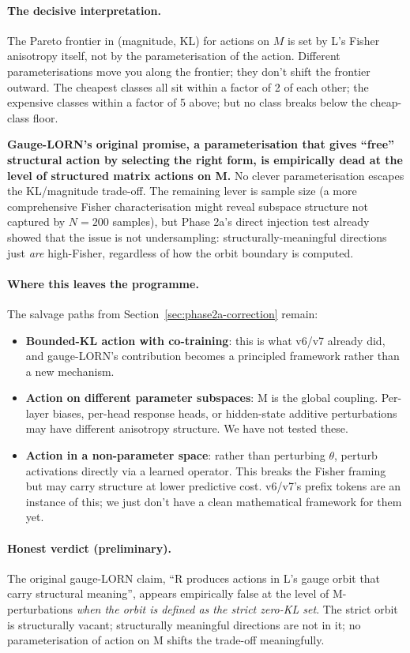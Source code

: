 \documentclass[11pt, a4paper]{article}
\theoremstyle{plain}
\theoremstyle{definition}
\theoremstyle{remark}
\begin{document}
\paragraph{The decisive interpretation.}
The Pareto frontier in (magnitude, KL) for actions on $M$ is set by L's Fisher anisotropy itself, not by the parameterisation of the action.
Different parameterisations move you along the frontier; they don't shift the frontier outward.
The cheapest classes all sit within a factor of 2 of each other; the expensive classes within a factor of 5 above; but no class breaks below the cheap-class floor.

\textbf{Gauge-LORN's original promise, a parameterisation that gives ``free'' structural action by selecting the right form, is empirically dead at the level of structured matrix actions on M.}
No clever parameterisation escapes the KL/magnitude trade-off.
The remaining lever is sample size (a more comprehensive Fisher characterisation might reveal subspace structure not captured by $N = 200$ samples), but Phase 2a's direct injection test already showed that the issue is not undersampling: structurally-meaningful directions just \emph{are} high-Fisher, regardless of how the orbit boundary is computed.

\paragraph{Where this leaves the programme.}
The salvage paths from Section~\ref{sec:phase2a-correction} remain:
\begin{itemize}[nosep]
\item \textbf{Bounded-KL action with co-training}: this is what v6/v7 already did, and gauge-LORN's contribution becomes a principled framework rather than a new mechanism.
\item \textbf{Action on different parameter subspaces}: M is the global coupling. Per-layer biases, per-head response heads, or hidden-state additive perturbations may have different anisotropy structure. We have not tested these.
\item \textbf{Action in a non-parameter space}: rather than perturbing $\theta$, perturb activations directly via a learned operator. This breaks the Fisher framing but may carry structure at lower predictive cost. v6/v7's prefix tokens are an instance of this; we just don't have a clean mathematical framework for them yet.
\end{itemize}

\paragraph{Honest verdict (preliminary).}
The original gauge-LORN claim, ``R produces actions in L's gauge orbit that carry structural meaning'', appears empirically false at the level of M-perturbations \emph{when the orbit is defined as the strict zero-KL set}.
The strict orbit is structurally vacant; structurally meaningful directions are not in it; no parameterisation of action on M shifts the trade-off meaningfully.
\end{document}
